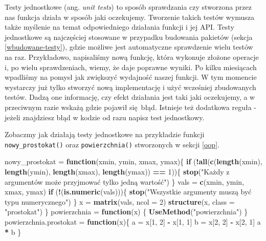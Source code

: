 \documentclass[paper=6in:9in,pagesize=pdftex,headinclude=on,footinclude=on,10pt]{scrbook}
\newenvironment{Shaded}{\begin{snugshade}}{\end{snugshade}}
\newcommand{\ControlFlowTok}[1]{\textcolor[rgb]{0.13,0.29,0.53}{\textbf{#1}}}
\newcommand{\DataTypeTok}[1]{\textcolor[rgb]{0.13,0.29,0.53}{#1}}
\newcommand{\DecValTok}[1]{\textcolor[rgb]{0.00,0.00,0.81}{#1}}
\newcommand{\KeywordTok}[1]{\textcolor[rgb]{0.13,0.29,0.53}{\textbf{#1}}}
\newcommand{\NormalTok}[1]{#1}
\newcommand{\OperatorTok}[1]{\textcolor[rgb]{0.81,0.36,0.00}{\textbf{#1}}}
\newcommand{\StringTok}[1]{\textcolor[rgb]{0.31,0.60,0.02}{#1}}
\begin{document}
Testy jednostkowe (ang. \emph{unit tests}) to sposób sprawdzania czy stworzona przez nas funkcja działa w sposób jaki oczekujemy.
Tworzenie takich testów wymusza także myślenie na temat odpowiedniego działania funkcji i jej API.
Testy jednostkowe są najczęściej stosowane w przypadku budowania pakietów (sekcja \ref{wbudowane-testy}), gdzie możliwe jest automatyczne sprawdzenie wielu testów na raz.
Przykładowo, napisaliśmy nową funkcję, która wykonuje złożone operacje i, po wielu sprawdzeniach, wiemy, że daje poprawne wyniki.
Po kilku miesiącach wpadliśmy na pomysł jak zwiększyć wydajność naszej funkcji.
W tym momencie wystarczy już tylko stworzyć nową implementację i użyć wcześniej zbudowanych testów.
Dadzą one informację, czy efekt działania jest taki jaki oczekujemy, a w przeciwnym razie wskażą gdzie pojawił się~błąd.
Istnieje też dodatkowa reguła - jeżeli znajdziesz błąd w kodzie od razu napisz test jednostkowy.

Zobaczmy jak działają testy jednostkowe na przykładzie funkcji \texttt{nowy\_prostokat()} oraz \texttt{powierzchnia()} stworzonych w sekcji \ref{oop}.

\begin{Shaded}
\begin{Highlighting}[]
\NormalTok{nowy_prostokat =}\StringTok{ }\ControlFlowTok{function}\NormalTok{(xmin, ymin, xmax, ymax)\{}
  \ControlFlowTok{if}\NormalTok{ (}\OperatorTok{!}\KeywordTok{all}\NormalTok{(}\KeywordTok{c}\NormalTok{(}\KeywordTok{length}\NormalTok{(xmin), }\KeywordTok{length}\NormalTok{(ymin), }\KeywordTok{length}\NormalTok{(xmax), }\KeywordTok{length}\NormalTok{(ymax)) }\OperatorTok{==}\StringTok{ }\DecValTok{1}\NormalTok{))\{}
    \KeywordTok{stop}\NormalTok{(}\StringTok{"Każdy z argumentów może przyjmować tylko jedną wartość"}\NormalTok{)}
\NormalTok{  \}}
\NormalTok{  vals =}\StringTok{ }\KeywordTok{c}\NormalTok{(xmin, ymin, xmax, ymax)}
  \ControlFlowTok{if}\NormalTok{ (}\OperatorTok{!}\NormalTok{(}\KeywordTok{is.numeric}\NormalTok{(vals)))\{}
    \KeywordTok{stop}\NormalTok{(}\StringTok{"Wszystkie argumenty muszą być typu numerycznego"}\NormalTok{)}
\NormalTok{  \}}
\NormalTok{  x =}\StringTok{ }\KeywordTok{matrix}\NormalTok{(vals, }\DataTypeTok{ncol =} \DecValTok{2}\NormalTok{)}
  \KeywordTok{structure}\NormalTok{(x, }\DataTypeTok{class =} \StringTok{"prostokat"}\NormalTok{)}
\NormalTok{\}}
\NormalTok{powierzchnia =}\StringTok{ }\ControlFlowTok{function}\NormalTok{(x) \{}
  \KeywordTok{UseMethod}\NormalTok{(}\StringTok{"powierzchnia"}\NormalTok{)}
\NormalTok{\}}
\NormalTok{powierzchnia.prostokat =}\StringTok{ }\ControlFlowTok{function}\NormalTok{(x)\{}
\NormalTok{  a =}\StringTok{ }\NormalTok{x[}\DecValTok{1}\NormalTok{, }\DecValTok{2}\NormalTok{] }\OperatorTok{-}\StringTok{ }\NormalTok{x[}\DecValTok{1}\NormalTok{, }\DecValTok{1}\NormalTok{]}
\NormalTok{  b =}\StringTok{ }\NormalTok{x[}\DecValTok{2}\NormalTok{, }\DecValTok{2}\NormalTok{] }\OperatorTok{-}\StringTok{ }\NormalTok{x[}\DecValTok{2}\NormalTok{, }\DecValTok{1}\NormalTok{]}
\NormalTok{  a }\OperatorTok{*}\StringTok{ }\NormalTok{b}
\NormalTok{\}}
\end{Highlighting}
\end{Shaded}
\end{document}
